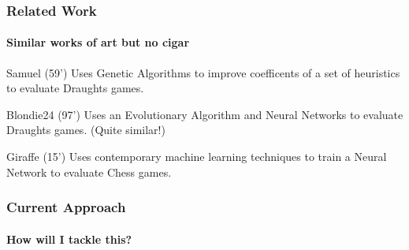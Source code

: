\documentclass{beamer}
\begin{document}
\begin{frame}
    \frametitle{Related Work}
    \framesubtitle{Similar works of art but no cigar}
    \begin{block}{Samuel (59')}
        Uses Genetic Algorithms to improve coefficents of a set of heuristics to evaluate Draughts games.
    \end{block}
    \begin{block}{Blondie24 (97')}
        Uses an Evolutionary Algorithm and Neural Networks to evaluate Draughts games. (Quite similar!)
    \end{block}

     \begin{block}{Giraffe (15')}
        Uses contemporary machine learning techniques to train a Neural Network to evaluate Chess games.
     \end{block}
\end{frame}


\begin{frame}
    \frametitle{Current Approach}
    \framesubtitle{How will I tackle this?}
\end{frame}
\end{document}

